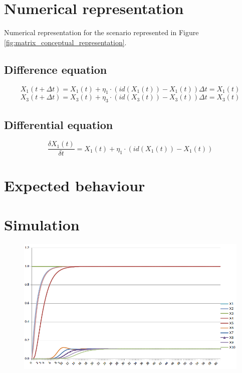 \documentclass[a4paper]{article}
\begin{document}
\section{Numerical representation}

Numerical representation for the scenario represented in Figure \ref{fig:matrix_conceptual_representation}.

\subsection{Difference equation}

\begin{equation}
X_{1}(t+\Delta t) = X_{1}(t) + \eta_{1} \cdot ( id(X_{1}(t)) - X_{1}(t))\Delta t = X_{1}(t)
\end{equation}
\begin{equation}
X_{3}(t+\Delta t) = X_{3}(t) + \eta_{3} \cdot ( id(X_{3}(t)) - X_{3}(t))\Delta t = X_{3}(t)
\end{equation}



\subsection{Differential equation}

\begin{equation}
\frac{\delta X_{1}(t)}{\delta t} = X_{1}(t) + \eta_{1} \cdot ( id(X_{1}(t)) - X_{1}(t))
\end{equation}

\section{Expected behaviour}






\section{Simulation}

\begin{figure}
\center
\includegraphics[width=\textwidth]{img/numerical_representation}
\end{figure}




\end{document}
